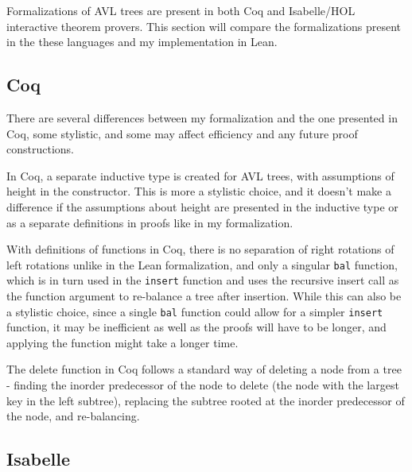 Formalizations of AVL trees are present in both Coq and Isabelle/HOL interactive theorem provers. This section will compare the formalizations present in the these languages and my implementation in Lean.

\subsection*{Coq}
There are several differences between my formalization and the one presented in Coq, some stylistic, and some may affect efficiency and any future proof constructions.

In Coq, a separate inductive type is created for AVL trees, with assumptions of height in the constructor. This is more a stylistic choice, and it doesn't make a difference if the assumptions about height are presented in the inductive type or as a separate definitions in proofs like in my formalization. 

With definitions of functions in Coq, there is no separation of right rotations of left rotations unlike in the Lean formalization, and only a singular \lstinline{bal} function, which is in turn used in the \lstinline{insert} function and uses the recursive insert call as the function argument to re-balance a tree after insertion. While this can also be a stylistic choice, since a single \lstinline{bal} function could allow for a simpler \lstinline{insert} function, it may be inefficient as well as the proofs will have to be longer, and applying the function might take a longer time. 

The delete function in Coq follows a standard way of deleting a node from a tree - finding the inorder predecessor of the node to delete (the node with the largest key in the left subtree), replacing the subtree rooted at the inorder predecessor of the node, and re-balancing. 

\subsection*{Isabelle}
